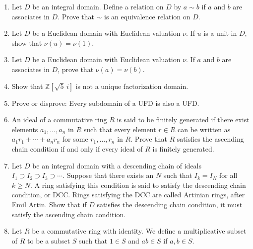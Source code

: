 {\begin{enumerate}
\item
Let $D$ be an integral domain. Define a relation on $D$ by $a \sim b$
if $a$ and $b$ are associates in $D$.  Prove that $\sim$ is an
equivalence relation on $D$.  


\item
Let $D$ be a Euclidean domain with Euclidean valuation $\nu$.  If $u$
is a unit in $D$, show that $\nu(u) = \nu(1)$.


\item
Let $D$ be a Euclidean domain with Euclidean valuation $\nu$.  If $a$
and $b$ are associates in $D$, prove that $\nu(a) = \nu(b)$.


\item
Show that ${\mathbb Z}[\sqrt{5}\, i]$ is not a unique factorization domain.



\item
Prove or disprove:  Every subdomain of a UFD is also a UFD.


\item
An ideal of a commutative ring $R$ is said to be {\bfi finitely
generated\/} if there exist elements
$a_1, \ldots, a_n$ in $R$ such that every element $r \in R$ can be
written as $a_1 r_1 + \cdots + a_n r_n$ for some $r_1, \ldots, r_n$ in
$R$.  Prove that $R$ satisfies the ascending chain condition if and
only if every ideal of $R$ is finitely generated.  


\item
Let $D$ be an integral domain with a descending chain of ideals $I_1
\supset I_2 \supset I_3 \supset \cdots$.  Suppose that there exists an $N$ such that
$I_k = I_N$ for all $k \geq N$. A ring satisfying this condition is
said to satisfy the {\bfi descending chain condition}, or {\bfi DCC}. Rings satisfying the DCC are called
{\bfi Artinian rings}, after Emil
Artin.  Show that if $D$ satisfies the descending chain condition, it must satisfy the ascending chain condition.


\item
Let $R$ be a commutative ring with identity. We define a {\bfi
multiplicative subset\/} of $R$ to be a
subset $S$ such that $1 \in S$ and $ab \in S$ if $a, b \in S$. 
\begin{enumerate}


\end{enumerate}
\end{enumerate}}
